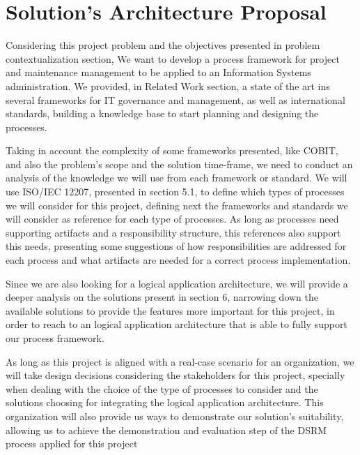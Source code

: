 
% 
% 

\section{Solution's Architecture Proposal}

Considering this project problem and the objectives presented in problem contextualization section, We want to develop a process framework for project and maintenance management to be applied to an Information Systems administration. We provided, in Related Work section, a state of the art ins several frameworks for IT governance and management, as well as international standards, building a knowledge base to start planning and designing the processes.\par
Taking in account the complexity of some frameworks presented, like COBIT, and also the problem's scope and the solution time-frame, we need to conduct an analysis of the knowledge we will use from each framework or standard. We will use ISO/IEC 12207, presented in section 5.1, to define which types of processes we will consider for this project, defining next the frameworks and standards we will consider as reference for each type of processes. As long as processes need supporting artifacts and a responsibility structure, this references also support this needs, presenting some suggestions of how responsibilities are addressed for each process and what artifacts are needed for a correct process implementation.\par
Since we are also looking for a logical application architecture, we will provide a deeper analysis on the solutions present in section 6, narrowing down the available solutions to provide the features more important for this project, in order to reach to an logical application architecture that is able to fully support our process framework.\par
As long as this project is aligned with a real-case scenario for an organization, we will take design decisions considering the stakeholders for this project, specially when dealing with the choice of the type of processes to consider and the solutions choosing for integrating the logical application architecture. This organization will also provide us ways to demonstrate our solution's suitability, allowing us to achieve the demonstration and evaluation step of the DSRM process applied for this project\par




